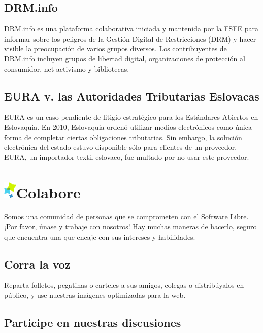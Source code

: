 \documentclass[10pt,foldmark,tumble]{leaflet}
\begin{document}
\subsection{DRM.info}

    DRM.info es una plataforma colaborativa iniciada y mantenida por la FSFE para informar sobre los peligros de la Gestión Digital de Restricciones (DRM) y hacer visible la preocupación de varios grupos diversos. Los contribuyentes de DRM.info incluyen grupos de libertad digital, organizaciones de protección al consumidor, net-activismo y bibliotecas.
    
\subsection{EURA v. las Autoridades Tributarias Eslovacas}

    EURA es un caso pendiente de litigio estratégico para los Estándares Abiertos en Eslovaquia. En 2010, Eslovaquia ordenó utilizar medios electrónicos como única forma de completar ciertas obligaciones tributarias. Sin embargo, la solución electrónica del estado estuvo disponible sólo para clientes de un proveedor. EURA, un importador textil eslovaco, fue multado por no usar este proveedor.

\section{\includegraphics{item.png}Colabore}

 Somos una comunidad de personas que se comprometen con el Software Libre. ¡Por favor, únase y trabaje con nosotros! Hay muchas maneras de hacerlo, seguro que encuentra una que encaje con sus intereses y habilidades.

\subsection{Corra la voz}

    Reparta folletos, pegatinas o carteles a sus amigos, colegas o distribúyalos en público, y use nuestras imágenes optimizadas para la web.
    
\subsection{Participe en nuestras discusiones}
\end{document}
